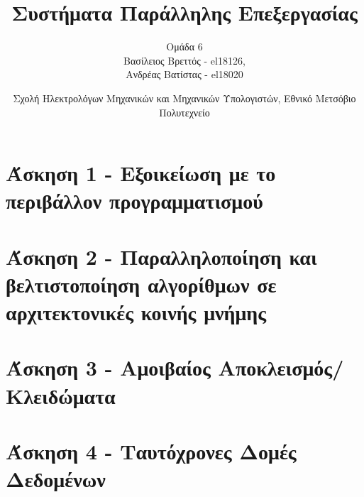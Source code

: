 \documentclass[letterpaper,12pt]{article}
\begin{document}
\title{Συστήματα Παράλληλης Επεξεργασίας}
\author{Ομάδα 6 \\
Βασίλειος Βρεττός - el18126, \\
Ανδρέας Βατίστας - el18020 \\}
\date{Σχολή Ηλεκτρολόγων Μηχανικών και Μηχανικών Υπολογιστών, Εθνικό Μετσόβιο Πολυτεχνείο}
\maketitle

\section{Άσκηση 1 - Εξοικείωση με το περιβάλλον προγραμματισμού}


\section{Άσκηση 2 - Παραλληλοποίηση και βελτιστοποίηση αλγορίθμων σε αρχιτεκτονικές κοινής μνήμης}


\section{Άσκηση 3 - Αμοιβαίος Αποκλεισμός/Κλειδώματα}


\section{Άσκηση 4 - Ταυτόχρονες Δομές Δεδομένων}

\end{document}
